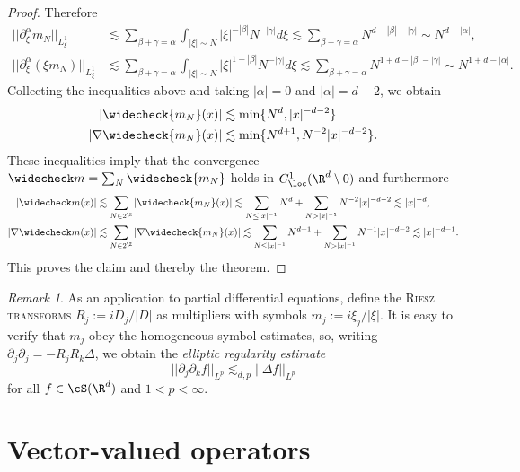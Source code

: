 \documentclass[reqno]{amsart}
\theoremstyle{definition}
\theoremstyle{remark}
\newtheorem*{remark}{Remark}
\renewcommand{\emph}{\textsc}
\begin{document}
\begin{proof}
	Therefore
		\begin{align*}
			||\partial^\alpha_\xi m_N||_{L^1_\xi}
				&\lesssim \sum_{\beta + \gamma = \alpha} \int_{|\xi| \sim N} |\xi|^{ - |\beta|} N^{-|\gamma|} d \xi \lesssim \sum_{\beta + \gamma = \alpha} N^{ d - |\beta| - |\gamma|} \sim N^{d - |\alpha|}, \\
			||\partial^\alpha_\xi (\xi m_N)||_{L^1_\xi}
				&\lesssim \sum_{\beta + \gamma = \alpha} \int_{|\xi| \sim N} |\xi|^{1 - |\beta|} N^{-|\gamma|} d \xi \lesssim \sum_{\beta + \gamma = \alpha} N^{1 + d - |\beta| - |\gamma|} \sim N^{1 + d - |\alpha|}. 
		\end{align*}
	Collecting the inequalities above and taking $|\alpha| = 0$ and $|\alpha| = d + 2$, we obtain
		\begin{align*}
			|\widecheck{m_N} (x)|
				&\lesssim \min\{ N^d, |x|^{-d - 2} \}\\
			|\nabla \widecheck{m_N} (x) | 
				&\lesssim \min \{ N^{d + 1}, N^{-2} |x|^{- d - 2} \}.
		\end{align*}	 
	These inequalities imply that the convergence $\widecheck m = \sum_N \widecheck{m_N}$ holds in $C^1_{\loc} (\R^d \setminus 0)$ and furthermore
		\begin{align*} 
			|\widecheck m (x)|
				&\lesssim \sum_{N \in 2^\Z} |\widecheck{m_N} (x)| \lesssim \sum_{N \leq |x|^{-1}} N^{d} + \sum_{N > |x|^{-1}} N^{-2}|x|^{-d - 2} \lesssim |x|^{-d},\\
			|\nabla \widecheck m (x)|
				&\lesssim \sum_{N \in 2^\Z} |\nabla \widecheck{m_N} (x)| \lesssim \sum_{N \leq |x|^{-1}} N^{d + 1} + \sum_{N > |x|^{-1}} N^{-1} |x|^{-d - 2} \lesssim |x|^{-d - 1}. 
		\end{align*}	
	This proves the claim and thereby the theorem. 	
\end{proof}

\begin{remark}
	As an application to partial differential equations, define the \emph{Riesz transforms} $R_j := i D_j/|D|$ as multipliers with symbols $m_j := i\xi_j/|\xi|$. It is easy to verify that $m_j$ obey the homogeneous symbol estimates, so, writing $\partial_j \partial_j = - R_j R_k \Delta$, we obtain the \textit{elliptic regularity estimate}
		\[ ||\partial_j \partial_k f||_{L^p} \lesssim_{d, p} ||\Delta f||_{L^p} \]
	for all $f \in \cS (\R^d)$ and $1 < p < \infty$. 	
\end{remark}

\section{Vector-valued operators}
\end{document}
